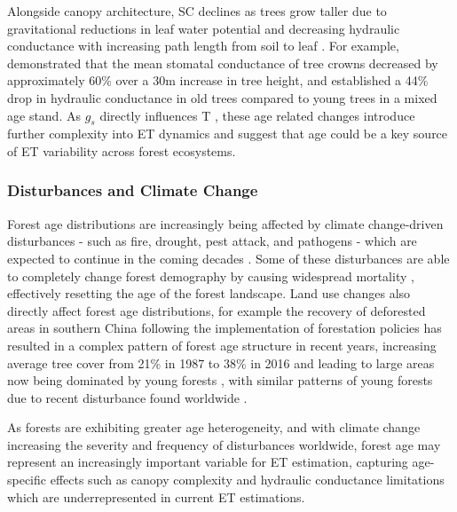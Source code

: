 \par Alongside canopy architecture, \ac{SC} declines as trees grow taller due to gravitational reductions in leaf water potential and decreasing hydraulic conductance with increasing path length from soil to leaf \parencite{ryan1997hydraulic}. For example, \textcite{schafer2000effect} demonstrated that the mean stomatal conductance of tree crowns decreased by approximately 60\% over a 30m increase in tree height, and \textcite{hubbard1999evidence} established a 44\% drop in hydraulic conductance in old trees compared to young trees in a mixed age stand. As $g_s$ directly influences T \parencite{monteith1965evaporation}, these age related changes introduce further complexity into ET dynamics and suggest that age could be a key source of ET variability across forest ecosystems.


\subsubsection{Disturbances and Climate Change}
Forest age distributions are increasingly being affected by climate change-driven disturbances - such as fire, drought, pest attack, and pathogens - which are expected to continue in the coming decades \parencite{solomon2009irreversible, seidl2017forest, altman2024global}. Some of these disturbances are able to completely change forest demography by causing widespread mortality \parencite{dale2001climate}, effectively resetting the age of the forest landscape. Land use changes also directly affect forest age distributions, for example the recovery of deforested areas in southern China following the implementation of forestation policies has resulted in a complex pattern of forest age structure in recent years, increasing average tree cover from 21\% in 1987 to 38\% in 2016 and leading to large areas now being dominated by young forests \parencite{tong2020forest, leng2024forest}, with similar patterns of young forests due to recent disturbance found worldwide \parencite{besnard2021mapping}.
\par As forests are exhibiting greater age heterogeneity, and with climate change increasing the severity and frequency of disturbances worldwide, forest age may represent an increasingly important variable for ET estimation, capturing age-specific effects such as canopy complexity and hydraulic conductance limitations which are underrepresented in current ET estimations. 


